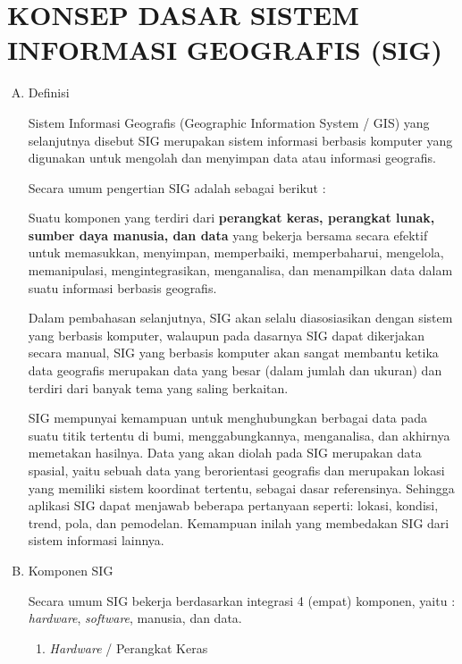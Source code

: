 

\chapter{KONSEP DASAR SISTEM INFORMASI GEOGRAFIS (SIG)}

\begin{enumerate}[A.]
\item{Definisi}

Sistem Informasi Geografis (Geographic Information System / GIS) yang selanjutnya disebut SIG merupakan sistem informasi berbasis komputer yang digunakan untuk mengolah dan menyimpan data atau informasi geografis.

Secara umum pengertian SIG adalah sebagai berikut :
\begin{italicquotes}
Suatu komponen yang terdiri dari \textbf{perangkat keras, perangkat lunak, sumber daya manusia, dan data} yang bekerja bersama secara efektif untuk memasukkan, menyimpan, memperbaiki, memperbaharui, mengelola, memanipulasi, mengintegrasikan, menganalisa, dan menampilkan data dalam suatu informasi berbasis geografis.
\end{italicquotes}

Dalam pembahasan selanjutnya, SIG akan selalu diasosiasikan dengan sistem yang berbasis komputer, walaupun pada dasarnya SIG dapat dikerjakan secara manual, SIG yang berbasis komputer akan sangat membantu ketika data geografis merupakan data yang besar (dalam jumlah dan ukuran) dan terdiri dari banyak tema yang saling berkaitan.

SIG mempunyai kemampuan untuk menghubungkan berbagai data pada suatu titik tertentu di bumi, menggabungkannya, menganalisa, dan akhirnya memetakan hasilnya. Data yang akan diolah pada SIG merupakan data spasial, yaitu sebuah data yang berorientasi geografis dan merupakan lokasi yang memiliki sistem koordinat tertentu, sebagai dasar referensinya. Sehingga aplikasi SIG dapat menjawab beberapa pertanyaan seperti: lokasi, kondisi, trend, pola, dan pemodelan. Kemampuan inilah yang membedakan SIG dari sistem informasi lainnya.

\item{Komponen SIG}

Secara umum SIG bekerja berdasarkan integrasi 4 (empat) komponen, yaitu : \textit{hardware}, \textit{software}, manusia, dan data.

\begin{enumerate}[1.]
\item \textit{Hardware} / Perangkat Keras


\end{enumerate}
\end{enumerate}
